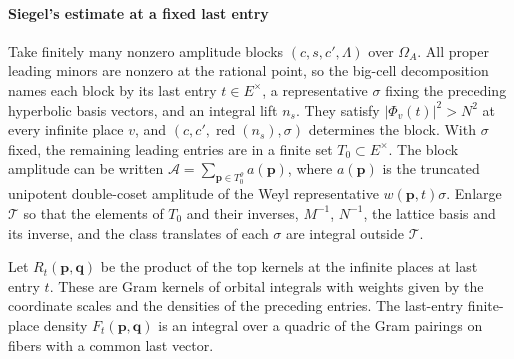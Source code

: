 \paragraph{Siegel's estimate at a fixed last entry}
Take finitely many nonzero amplitude blocks \((c,s,c',\Lambda)\) over
\(\Omega_A\). All proper leading minors are nonzero at the rational
point, so the big-cell decomposition names each block by its last
entry \(t\in E^\times\), a representative \(\sigma\) fixing the preceding
hyperbolic basis vectors, and an integral lift \(n_s\).
They satisfy \(|\Phi_v(t)|^2>N^2\) at every infinite place \(v\), and
\((c,c',\operatorname{red}(n_s),\sigma)\) determines the block.
With \(\sigma\) fixed, the remaining leading entries are in a finite set
\(T_0\subset E^\times\). The block amplitude can be written
\(\mathcal A=\sum_{\mathbf p\in T_0^\varrho} a(\mathbf p)\), where
\(a(\mathbf p)\) is the truncated unipotent double-coset amplitude of the
Weyl representative \(w(\mathbf p,t)\sigma\). Enlarge \(\mathcal T\) so
that the elements of \(T_0\) and their inverses, \(M^{-1}\), \(N^{-1}\),
the lattice basis and its inverse, and the class translates of each
\(\sigma\) are integral outside \(\mathcal T\).

Let \(R_t(\mathbf p,\mathbf q)\) be the product of the top
kernels at the infinite places at last entry \(t\). These are Gram kernels
of orbital integrals with weights given by the coordinate scales and the
densities of the preceding entries. The last-entry finite-place density
\(F_t(\mathbf p,\mathbf q)\) is an integral over a quadric of the Gram
pairings on fibers with a common last vector.

